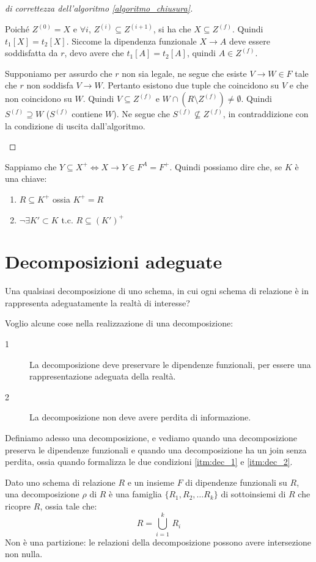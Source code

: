 \begin{proof}[di correttezza dell'algoritmo \ref{algoritmo_chiusura}]
\begin{enumerate}
    Poich\'e $Z^{(0)} = X$ e $\forall i$, $Z^{(i)} \subseteq Z^{(i+1)}$, si ha che $X \subseteq Z^{(f)}$. Quindi $t_1[X] = t_2[X]$. Siccome la dipendenza funzionale $X \to A$ deve essere soddisfatta da $r$, devo avere che $t_1[A] = t_2[A]$, quindi $A \in Z^{(f)}$.

    Supponiamo per assurdo che $r$ non sia legale, ne segue che esiste $V \to W \in F$ tale che $r$ non soddisfa $V \to W$. Pertanto esistono due tuple che coincidono su $V$ e che non coincidono su $W$. Quindi $V \subseteq Z^{(f)}$ e $W \cap (R \setminus Z^{(f)}) \neq \emptyset$. Quindi $S^{(f)} \supseteq W$ ($S^{(f)}$ contiene $W$). Ne segue che $S^{(f)} \not\subseteq Z^{(f)}$, in contraddizione con la condizione di uscita dall'algoritmo.
\end{enumerate}
\end{proof}

Sappiamo che $Y \subseteq X^+ \iff X \to Y \in F^A = F^+$. Quindi possiamo dire che, se $K$ \`e una chiave:
\begin{enumerate}
    \item $R \subseteq K^+$ ossia $K^+ = R$
    \item $\neg \exists K' \subset K $ t.c. $R \subseteq (K')^+$
\end{enumerate}

\section{Decomposizioni adeguate}

Una qualsiasi decomposizione di uno schema, in cui ogni schema di relazione \`e in  rappresenta adeguatamente la realt\`a di interesse?

Voglio alcune cose nella realizzazione di una decomposizione:
\begin{description}
    \item[1\label{itm:dec_1}] La decomposizione deve preservare le dipendenze funzionali, per essere una rappresentazione adeguata della realt\`a.
    \item[2\label{itm:dec_2}] La decomposizione non deve avere perdita di informazione.
\end{description}

Definiamo adesso una decomposizione, e vediamo quando una decomposizione preserva le dipendenze funzionali e quando una decomposizione ha un join senza perdita, ossia quando formalizza le due condizioni \ref{itm:dec_1} e \ref{itm:dec_2}.

\begin{defn}[Decomposizione]
Dato uno schema di relazione $R$ e un insieme $F$ di dipendenze funzionali su $R$, una decomposizione $\rho$ di $R$ \`e una famiglia $\{R_1, R_2, \dots R_k\}$ di sottoinsiemi di $R$ che ricopre $R$, ossia tale che:
\[
R = \bigcup_{i = 1}^{k} \, R_i
\]
Non \`e una partizione: le relazioni della decomposizione possono avere intersezione non nulla.
\end{defn}

